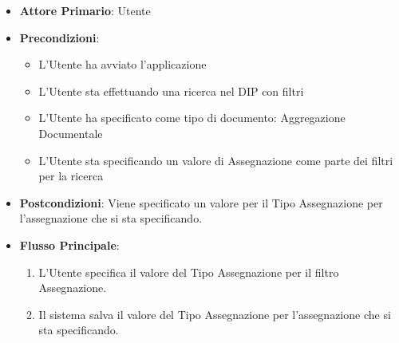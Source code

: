 \begin{itemize}
      \item \textbf{Attore Primario}: Utente
      \item \textbf{Precondizioni}: 
      \begin{itemize}
            \item L'Utente ha avviato l'applicazione
            \item L'Utente sta effettuando una ricerca nel DIP con filtri
            \item L'Utente ha specificato come tipo di documento: Aggregazione Documentale
            \item L'Utente sta specificando un valore di Assegnazione come parte dei filtri per la ricerca
      \end{itemize}
      \item \textbf{Postcondizioni}: Viene specificato un valore per il Tipo Assegnazione per l'assegnazione che si sta specificando.
      \item \textbf{Flusso Principale}:
      \begin{enumerate}
            \item L'Utente specifica il valore del Tipo Assegnazione per il filtro Assegnazione.
            \item Il sistema salva il valore del Tipo Assegnazione per l'assegnazione che si sta specificando.
      \end{enumerate}
\end{itemize}

